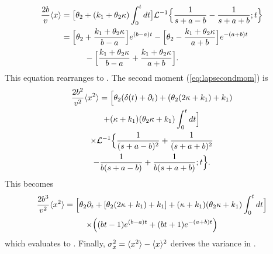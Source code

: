\DIFdelend \DIFaddbegin \begin{align}
\begin{split}
	\frac{2b}{v}\langle x \rangle &= \big[\theta_2 + (k_1+\theta_2 \kappa)\int_0^t dt\big]\mathcal{L}^{-1}\Big\{ \frac{1}{s+a-b}-\frac{1}{s+a+b};t\Big\}\\
	&= \Big[\theta_2 + \frac{k_1+\theta_2\kappa}{b-a}\Big]e^{(b-a)t} - \Big[\theta_2 - \frac{k_1+\theta_2\kappa}{a+b}\Big]e^{-(a+b)t} \\
 & \hspace{1cm}- \Big[\frac{k_1+\theta_2\kappa}{b-a} + \frac{k_1+\theta_2\kappa}{a+b}\Big].
\end{split}
\end{align}\DIFaddend 
This equation rearranges to \DIFdelbegin {}\DIFdelend \DIFaddbegin {}\DIFaddend .
The second moment (\DIFaddbegin {}\DIFaddend \ref{eq:lapsecondmom}) is 
\DIFdelbegin %
\DIFdelend \DIFaddbegin \begin{multline}
	\frac{2b^2}{v^2}\langle x^2 \rangle = \Big[\theta_2(\delta(t) + \partial_t) + (\theta_2(2\kappa + k_1)+k_1) \\ + (\kappa+k_1)(\theta_2\kappa+k_1)\int_0^t dt \Big] \\
	\times \mathcal{L}^{-1}\Big\{ \frac{1}{(s+a-b)^2} + \frac{1}{(s+a+b)^2} \\-\frac{1}{b(s+a-b)}+\frac{1}{b(s+a+b)};t\Big\}.
\end{multline}\DIFaddend 
This becomes 
\begin{multline}
	\frac{2b^3}{v^2}\langle x^2 \rangle = \Big[\theta_2\partial_t + [\theta_2(2\kappa+k_1)+k_1] + (\kappa+k_1)(\theta_2\kappa+k_1)\int_0^tdt\Big]\\
	\times \Big((bt-1)e^{(b-a)t}+(bt+1)e^{-(a+b)t}\Big)
\end{multline}
which evaluates to \DIFdelbegin {}\DIFdelend \DIFaddbegin {}\DIFaddend .
Finally, $\sigma_x^2 = \langle x^2 \rangle - \langle x \rangle^2$ derives the variance in \DIFdelbegin {}\DIFdelend \DIFaddbegin {}\DIFaddend .


